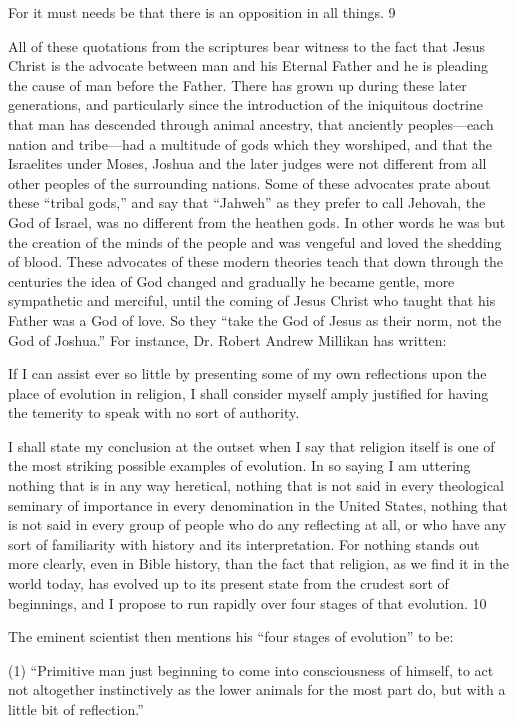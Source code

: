 For it must needs be that there is an opposition in all things. 9

All of these quotations from the scriptures bear witness to the fact that Jesus Christ is the
advocate between man and his Eternal Father and he is pleading the cause of man before the
Father. There has grown up during these later generations, and particularly since the
introduction of the iniquitous doctrine that man has descended through animal ancestry, that
anciently peoples—each nation and tribe—had a multitude of gods which they worshiped,
and that the Israelites under Moses, Joshua and the later judges were not different from all
other peoples of the surrounding nations. Some of these advocates prate about these ``tribal
gods,'' and say that ``Jahweh'' as they prefer to call Jehovah, the God of Israel, was no
different from the heathen gods. In other words he was but the creation of the minds of the
people and was vengeful and loved the shedding of blood. These advocates of these modern
theories teach that down through the centuries the idea of God changed and gradually he
became gentle, more sympathetic and merciful, until the coming of Jesus Christ who taught
that his Father was a God of love. So they ``take the God of Jesus as their norm, not the God
of Joshua.'' For instance, Dr. Robert Andrew Millikan has written:

If I can assist ever so little by presenting some of my own reflections upon the place of
evolution in religion, I shall consider myself amply justified for having the temerity to speak
with no sort of authority.

I shall state my conclusion at the outset when I say that religion itself is one of the most
striking possible examples of evolution. In so saying I am uttering nothing that is in any way
heretical, nothing that is not said in every theological seminary of importance in every
denomination in the United States, nothing that is not said in every group of people who do
any reflecting at all, or who have any sort of familiarity with history and its interpretation.
For nothing stands out more clearly, even in Bible history, than the fact that religion, as we
find it in the world today, has evolved up to its present state from the crudest sort of
beginnings, and I propose to run rapidly over four stages of that evolution. 10

The eminent scientist then mentions his ``four stages of evolution'' to be:

(1) ``Primitive man just beginning to come into consciousness of himself, to act not altogether
instinctively as the lower animals for the most part do, but with a little bit of reflection.''


